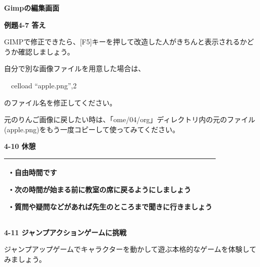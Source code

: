 \documentclass[a4paper,dvipdfmx]{jarticle}
\newcommand\textstyleqwerty[1]{#1}
\begin{document}
\bigskip


\bigskip


\bigskip


\bigskip


\bigskip


\bigskip

\textstyleqwerty{\textbf{Gimpの編集画面}}


\bigskip


\bigskip


\bigskip


\bigskip


\bigskip


\bigskip


\bigskip


\bigskip

{\bfseries
例題4-7 答え}


\bigskip

GIMPで修正できたら、[F5]キーを押して改造した人がきちんと表示されるかどうか確認しましょう。

自分で別な画像ファイルを用意した場合は、


\bigskip

\ \ celload “apple.png”,2


\bigskip

のファイル名を修正してください。

元のりんご画像に戻したい時は、「ome/04/org」ディレクトリ内の元のファイル(apple.png)をもう一度コピーして使ってみてください。


\bigskip


\bigskip


\bigskip

{\bfseries
4-10 休憩}


\bigskip

\begin{flushleft}
\tablefirsthead{}
\tablehead{}
\tabletail{}
\tablelasttail{}
\begin{supertabular}{|m{10.733cm}|}
\hline
・自由時間です

・次の時間が始まる前に教室の席に戻るようにしましょう

・質問や疑問などがあれば先生のところまで聞きに行きましょう\\\hline
\end{supertabular}
\end{flushleft}
\clearpage
\bigskip

{\bfseries
4-11 ジャンプアクションゲームに挑戦}


\bigskip

ジャンプアップゲームでキャラクターを動かして遊ぶ本格的なゲームを体験してみましょう。
\end{document}
